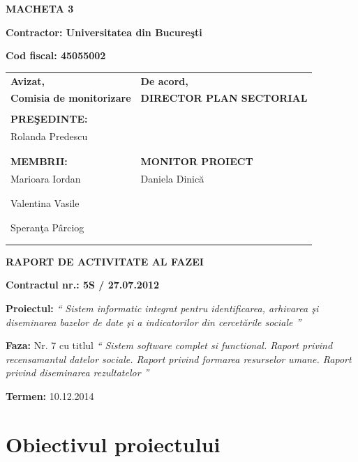 \documentclass[a4paper, 10pt]{article}
\title{}
\author{}
\date{2013-04-08}
\begin{document}
{\raggedleft\bfseries
MACHETA 3
\par}

{\bfseries
Contractor: Universitatea din Bucure\c{s}ti}

{\textbf{Cod fiscal: 45055002}

\bigskip


\begin{tabular}{@{}l l}
\textbf{Avizat,}&\textbf{De acord,}\\
\textbf{Comisia de monitorizare}&\textbf{DIRECTOR PLAN SECTORIAL}\\
\\
\textbf{PRE\c{S}EDINTE:}&\\
Rolanda Predescu&\\
\\
\\
\textbf{MEMBRII:}&\textbf{MONITOR PROIECT}\\
Marioara Iordan&Daniela Dinic\u{a}\\
\\
\\
Valentina Vasile&\\
\\
\\
Speran\c{t}a P\^{a}rciog\\
\\
\\
\end{tabular}

\bigskip

\bigskip

{\centering\bfseries
RAPORT DE ACTIVITATE AL FAZEI
\par}

\bigskip

{\bfseries
Contractul nr.: 5S / 27.07.2012}

{
\textbf{Proiectul: }
\textit{`` Sistem informatic integrat pentru identificarea, arhivarea \c{s}i diseminarea bazelor de date \c{s}i a indicatorilor din
cercet\u{a}rile sociale ''}}

{
\textbf{Faza: }
Nr. 7 cu titlul 
\textit{`` Sistem software complet si functional. Raport privind recensamantul datelor sociale. Raport privind formarea resurselor umane. Raport privind diseminarea rezultatelor ''}}

{\textbf{Termen:} 10.12.2014}

\medskip

\section{Obiectivul proiectului}

}
\end{document}
